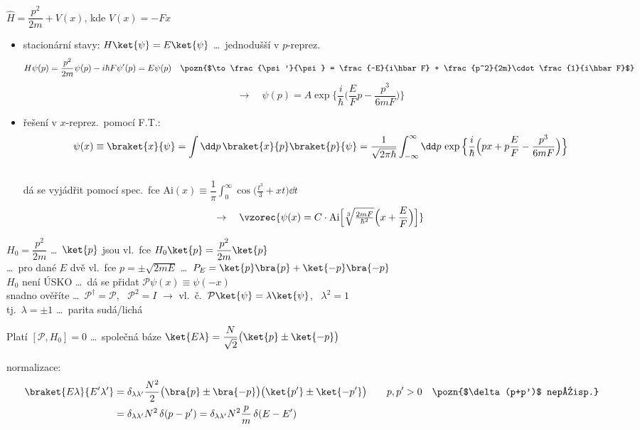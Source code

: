 \begin{priklad}
$\hat H = \dfrac{p^2}{2m} + V(x)$, \qquad kde $V(x) = -Fx$
\begin{itemize}[nosep]
  \item[--] stacionární stavy: \quad $H\ket{\psi} = E\ket{\psi}$ \quad \dots\ jednodušší v $p$-reprez.
  \[
    H\psi(p) = \frac{p^2}{2m}\psi(p) - i\hbar F\psi'(p) = E\psi(p)
    \quad \pozn{$\to \frac{\psi'}{\psi} = \frac{-E}{i\hbar F} + \frac{p^2}{2m}\cdot\frac{1}{i\hbar F}$}
  \]
  \[
    \to\quad \psi(p) = A\exp\Big\{\frac{i}{\hbar}\Big(\frac{E}{F}p - \frac{p^3}{6mF}\Big)\Big\}
  \]
  \item[--] řešení v $x$-reprez.\ pomocí F.T.:
  \[
    \psi(x) \equiv \braket{x}{\psi} = \int\dd p\,\braket{x}{p}\braket{p}{\psi}
    = \frac{1}{\sqrt{2\pi\hbar}}\int_{-\infty}^{\infty}\dd p\,\exp\Big\{\frac{i}{\hbar}\Big(px + p\frac{E}{F} - \frac{p^3}{6mF}\Big)\Big\}
  \]
   \\
  dá se vyjádřit pomocí spec.\ fce \quad $\mathrm{Ai}(x) \equiv \dfrac{1}{\pi}\displaystyle\int_0^\infty\cos\Big(\frac{t^3}{3} + xt\Big)\dd t$
  \[
    \to\quad \vzorec{\psi(x) = C\cdot\mathrm{Ai}\Big[\sqrt[3]{\tfrac{2mF}{\hbar^2}}\Big(x + \frac{E}{F}\Big)\Big]}
  \]
\end{itemize}
\end{priklad}

\underline{}

$H_0 = \dfrac{p^2}{2m}$ \quad \dots\ $\ket{p}$ jsou vl.\ fce \quad $H_0\ket{p} = \dfrac{p^2}{2m}\ket{p}$ \\
\dots\ pro dané $E$ dvě vl.\ fce \quad $p = \pm\sqrt{2mE}$ \quad \dots\ $P_E = \ket{p}\bra{p} + \ket{-p}\bra{-p}$ \\
$H_0$ není ÚSKO \dots\ dá se přidat  \quad $\mathcal{P}\psi(x) \equiv \psi(-x)$ \\
snadno ověříte \dots\ $\mathcal{P}^\dagger = \mathcal{P}$, \ $\mathcal{P}^2 = I$ \quad $\to$ vl.\ č.\ $\mathcal{P}\ket{\psi} = \lambda\ket{\psi}$, \ $\lambda^2 = 1$ \\
\hspace*{6cm} tj.\ $\lambda = \pm1$ \quad \dots\ parita sudá/lichá

Platí $[\mathcal{P},H_0] = 0$ \quad \dots\ společná báze \quad
$\ket{E\lambda} = \dfrac{N}{\sqrt2}\big(\ket{p} \pm \ket{-p}\big)$

normalizace:
\begin{align*}
  \braket{E\lambda}{E'\lambda'} &= \delta_{\lambda\lambda'}\frac{N^2}{2}\big(\bra{p} \pm \bra{-p}\big)\big(\ket{p'} \pm \ket{-p'}\big)
    \qquad p,p' > 0 \quad \pozn{$\delta(p+p')$ nepřisp.} \\
  &= \delta_{\lambda\lambda'}N^2\,\delta(p - p') = \delta_{\lambda\lambda'}N^2\frac{p}{m}\,\delta(E - E')
\end{align*}

